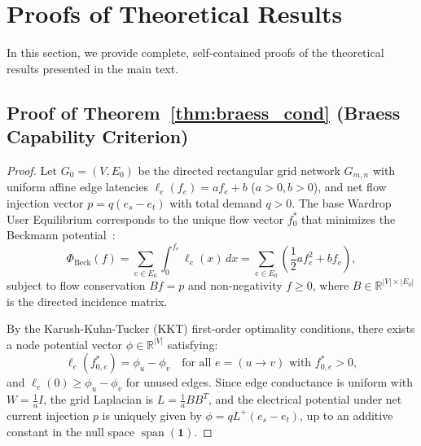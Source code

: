 \documentclass[11pt,a4paper]{article}
\begin{document}
\clearpage
\appendix

\section{Proofs of Theoretical Results}
\label{sec:appendix_proofs}

In this section, we provide complete, self-contained proofs of the theoretical results presented in the main text.

\subsection{Proof of Theorem~\ref{thm:braess_cond} (Braess Capability Criterion)}
\label{subsec:proof_thm1}

\begin{proof}
Let $G_0 = (V, E_0)$ be the directed rectangular grid network $G_{m,n}$ with uniform affine edge latencies $\ell_e(f_e) = a f_e + b$ ($a > 0, b > 0$), and net flow injection vector $p = q (e_s - e_t)$ with total demand $q > 0$. The base Wardrop User Equilibrium corresponds to the unique flow vector $f_0^*$ that minimizes the Beckmann potential~\cite{beckmann1956studies}:
\begin{equation}
\Phi_{\text{Beck}}(f) = \sum_{e \in E_0} \int_0^{f_e} \ell_e(x) \, dx = \sum_{e \in E_0} \left( \frac{1}{2} a f_e^2 + b f_e \right),
\end{equation}
subject to flow conservation $B f = p$ and non-negativity $f \ge 0$, where $B \in \mathbb{R}^{|V| \times |E_0|}$ is the directed incidence matrix.

By the Karush-Kuhn-Tucker (KKT) first-order optimality conditions, there exists a node potential vector $\phi \in \mathbb{R}^{|V|}$ satisfying:
\begin{equation}
\ell_e(f_{0, e}^*) = \phi_u - \phi_v \quad \text{for all } e = (u \to v) \text{ with } f_{0, e}^* > 0,
\end{equation}
and $\ell_e(0) \ge \phi_u - \phi_v$ for unused edges. Since edge conductance is uniform with $W = \frac{1}{a} I$, the grid Laplacian is $L = \frac{1}{a} B B^T$, and the electrical potential under net current injection $p$ is uniquely given by $\phi = q L^+ (e_s - e_t)$, up to an additive constant in the null space $\operatorname{span}(\mathbf{1})$.


\end{proof}
\end{document}
